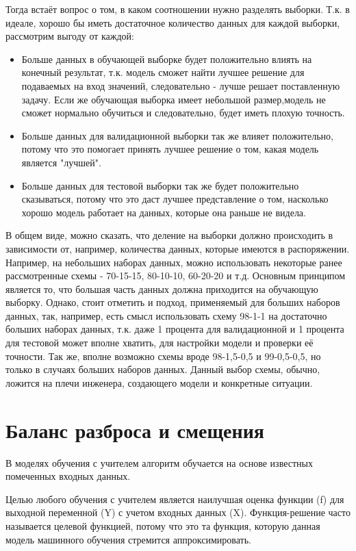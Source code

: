 Тогда встаёт вопрос о том, в каком соотношении нужно разделять выборки. Т.к. в идеале, хорошо бы иметь достаточное количество данных для каждой выборки, рассмотрим выгоду от каждой:

\begin{itemize}
	\item Больше данных в обучающей выборке будет положительно влиять на конечный результат, т.к. модель сможет найти лучшее решение для подаваемых на вход значений, следовательно - лучше решает поставленную задачу. Если же обучающая выборка имеет небольшой размер,модель не сможет нормально обучиться и следовательно, будет иметь плохую точность.
	\item Больше данных для валидационной выборки так же влияет положительно, потому что это помогает принять лучшее решение о том, какая модель является "лучшей".
	\item Больше данных для тестовой выборки так же будет положительно сказываться, потому что это даст лучшее представление о том, насколько хорошо модель работает на данных, которые она раньше не видела.
\end{itemize}

В общем виде, можно сказать, что деление на выборки должно происходить в зависимости от, например, количества данных, которые имеются в распоряжении. Например, на небольших наборах данных, можно использовать некоторые ранее рассмотренные схемы - 70-15-15, 80-10-10, 60-20-20 и т.д. Основным принципом является то, что большая часть данных должна приходится на обучающую выборку. Однако, стоит отметить и подход, применяемый для больших наборов данных, так, например, есть смысл использовать схему 98-1-1 на достаточно больших наборах данных, т.к. даже 1 процента для валидационной и 1 процента для тестовой может вполне хватить, для настройки модели и проверки её точности. Так же, вполне возможно схемы вроде 98-1,5-0,5 и 99-0,5-0,5, но только в случаях больших наборов данных. Данный выбор схемы, обычно, ложится на плечи инженера, создающего модели и конкретные ситуации.


\section{Баланс разброса и смещения}

В моделях обучения с учителем алгоритм обучается на основе известных помеченных входных данных.

Целью любого обучения с учителем является наилучшая оценка функции (f) для выходной переменной (Y) с учетом входных данных (X). Функция-решение часто называется целевой функцией, потому что это та функция, которую данная модель машинного обучения стремится аппроксимировать.

